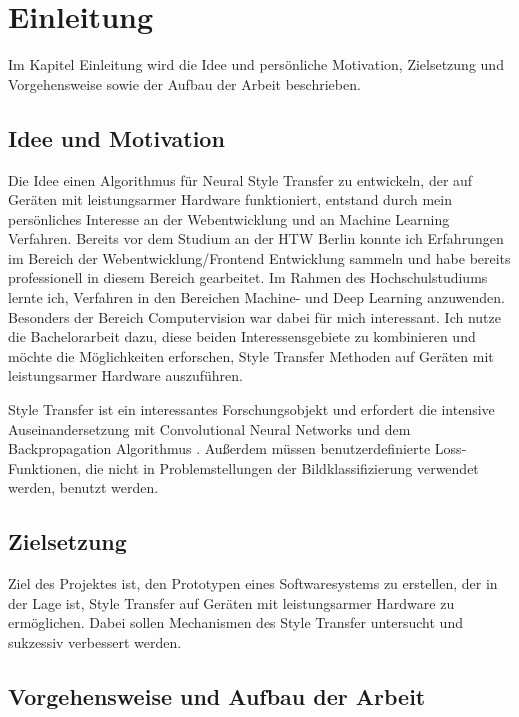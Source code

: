 \chapter{Einleitung}

Im Kapitel Einleitung wird die Idee und persönliche Motivation, Zielsetzung und Vorgehensweise sowie der Aufbau der Arbeit beschrieben.

\section{Idee und Motivation}

Die Idee einen Algorithmus für Neural Style Transfer zu entwickeln, der auf Geräten mit leistungsarmer Hardware funktioniert, entstand durch mein persönliches Interesse an der Webentwicklung und an Machine Learning Verfahren. Bereits vor dem Studium an der HTW Berlin konnte ich Erfahrungen im Bereich der Webentwicklung/Frontend Entwicklung sammeln und habe bereits professionell in diesem Bereich gearbeitet. Im Rahmen des Hochschulstudiums lernte ich, Verfahren in den Bereichen Machine- und Deep Learning anzuwenden. Besonders der Bereich Computervision war dabei für mich interessant. Ich nutze die Bachelorarbeit dazu, diese beiden Interessensgebiete zu kombinieren und möchte die Möglichkeiten erforschen, Style Transfer Methoden auf Geräten mit leistungsarmer Hardware auszuführen.

Style Transfer ist ein interessantes Forschungsobjekt und erfordert die intensive Auseinandersetzung mit Convolutional Neural Networks \cite{lecun-gradientbased-learning-applied-1998} und dem Backpropagation Algorithmus \cite{doi:10.1162/neco.1989.1.4.541}. Außerdem müssen benutzerdefinierte Loss-Funktionen, die nicht in Problemstellungen der Bildklassifizierung verwendet werden, benutzt werden.

\section{Zielsetzung}

Ziel des Projektes ist, den Prototypen eines Softwaresystems zu erstellen, der in der Lage ist, Style Transfer auf Geräten mit leistungsarmer Hardware zu ermöglichen. Dabei sollen Mechanismen des Style Transfer untersucht und sukzessiv verbessert werden.

\section{Vorgehensweise und Aufbau der Arbeit}

